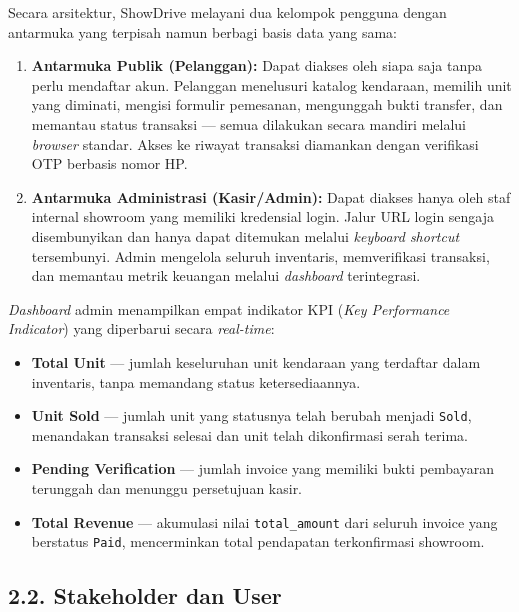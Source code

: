 \documentclass[11pt, a5paper]{article}
\begin{document}
Secara arsitektur, ShowDrive melayani dua kelompok pengguna dengan antarmuka yang
terpisah namun berbagi basis data yang sama:

\begin{enumerate}
  \item \textbf{Antarmuka Publik (Pelanggan):} Dapat diakses oleh siapa saja
        tanpa perlu mendaftar akun. Pelanggan menelusuri katalog kendaraan,
        memilih unit yang diminati, mengisi formulir pemesanan, mengunggah bukti
        transfer, dan memantau status transaksi — semua dilakukan secara mandiri
        melalui \textit{browser} standar. Akses ke riwayat transaksi diamankan
        dengan verifikasi OTP berbasis nomor HP.

  \item \textbf{Antarmuka Administrasi (Kasir/Admin):} Dapat diakses hanya oleh
        staf internal showroom yang memiliki kredensial login. Jalur URL login
        sengaja disembunyikan dan hanya dapat ditemukan melalui
        \textit{keyboard shortcut} tersembunyi. Admin mengelola seluruh
        inventaris, memverifikasi transaksi, dan memantau metrik keuangan
        melalui \textit{dashboard} terintegrasi.
\end{enumerate}

\textit{Dashboard} admin menampilkan empat indikator KPI (\textit{Key Performance
Indicator}) yang diperbarui secara \textit{real-time}:

\begin{itemize}
  \item \textbf{Total Unit} --- jumlah keseluruhan unit kendaraan yang terdaftar
        dalam inventaris, tanpa memandang status ketersediaannya.
  \item \textbf{Unit Sold} --- jumlah unit yang statusnya telah berubah menjadi
        \texttt{Sold}, menandakan transaksi selesai dan unit telah dikonfirmasi
        serah terima.
  \item \textbf{Pending Verification} --- jumlah invoice yang memiliki bukti
        pembayaran terunggah dan menunggu persetujuan kasir.
  \item \textbf{Total Revenue} --- akumulasi nilai \texttt{total\_amount} dari
        seluruh invoice yang berstatus \texttt{Paid}, mencerminkan total
        pendapatan terkonfirmasi showroom.
\end{itemize}

\subsection*{2.2. Stakeholder dan User}
\end{document}
